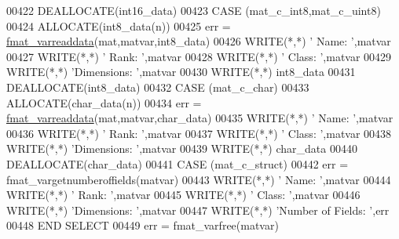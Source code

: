 \begin{DoxyCode}
{00422                     \textcolor{keyword}{DEALLOCATE}(int16\_data)
00423                 \textcolor{keywordflow}{CASE} (mat\_c\_int8,mat\_c\_uint8)
00424                     \textcolor{keyword}{ALLOCATE}(int8\_data(n))
00425                     err = \hyperlink{interfacematio_1_1fmat__varreaddata}{fmat\_varreaddata}(mat,matvar,int8\_data)
00426                     \textcolor{keyword}{WRITE}(*,*) \textcolor{stringliteral}{'      Name: '},matvar%
00427                     \textcolor{keyword}{WRITE}(*,*) \textcolor{stringliteral}{'      Rank: '},matvar%
00428                     \textcolor{keyword}{WRITE}(*,*) \textcolor{stringliteral}{'     Class: '},matvar%
00429                     \textcolor{keyword}{WRITE}(*,*) \textcolor{stringliteral}{'Dimensions: '},matvar%
00430                     \textcolor{keyword}{WRITE}(*,*) int8\_data
00431                     \textcolor{keyword}{DEALLOCATE}(int8\_data)
00432                 \textcolor{keywordflow}{CASE} (mat\_c\_char)
00433                     \textcolor{keyword}{ALLOCATE}(char\_data(n))
00434                     err = \hyperlink{interfacematio_1_1fmat__varreaddata}{fmat\_varreaddata}(mat,matvar,char\_data)
00435                     \textcolor{keyword}{WRITE}(*,*) \textcolor{stringliteral}{'      Name: '},matvar%
00436                     \textcolor{keyword}{WRITE}(*,*) \textcolor{stringliteral}{'      Rank: '},matvar%
00437                     \textcolor{keyword}{WRITE}(*,*) \textcolor{stringliteral}{'     Class: '},matvar%
00438                     \textcolor{keyword}{WRITE}(*,*) \textcolor{stringliteral}{'Dimensions: '},matvar%
00439                     \textcolor{keyword}{WRITE}(*,*) char\_data
00440                     \textcolor{keyword}{DEALLOCATE}(char\_data)
00441                 \textcolor{keywordflow}{CASE} (mat\_c\_struct)
00442                     err = fmat\_vargetnumberoffields(matvar)
00443                     \textcolor{keyword}{WRITE}(*,*) \textcolor{stringliteral}{'      Name: '},matvar%
00444                     \textcolor{keyword}{WRITE}(*,*) \textcolor{stringliteral}{'      Rank: '},matvar%
00445                     \textcolor{keyword}{WRITE}(*,*) \textcolor{stringliteral}{'     Class: '},matvar%
00446                     \textcolor{keyword}{WRITE}(*,*) \textcolor{stringliteral}{'Dimensions: '},matvar%
00447                     \textcolor{keyword}{WRITE}(*,*) \textcolor{stringliteral}{'Number of Fields: '},err
00448 \textcolor{keywordflow}{            END SELECT}
00449             err = fmat\_varfree(matvar)
}
\end{DoxyCode}
